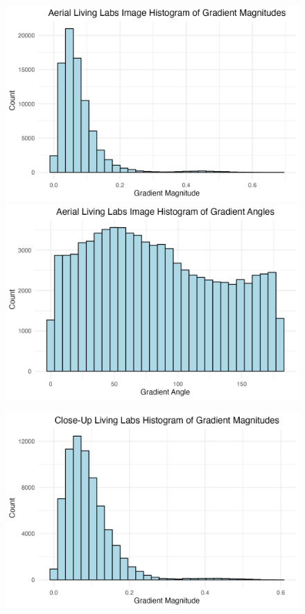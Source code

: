 \documentclass[
  letterpaper,
  DIV=11,
  numbers=noendperiod]{scrreprt}
\begin{document}
\begin{figure}
%
\begin{minipage}{0.33\linewidth}
\includegraphics{images/plots/grass/aerial_living_lab_histogram_mag_plot.jpg}
\includegraphics{images/plots/grass/aerial_living_lab_histogram_theta_plot.jpg}\end{minipage}%
%
\begin{minipage}{0.33\linewidth}
\includegraphics{images/plots/grass/close_up_living_lab_histogram_mag_plot.jpg}

\end{minipage}
\end{figure}
\end{document}
